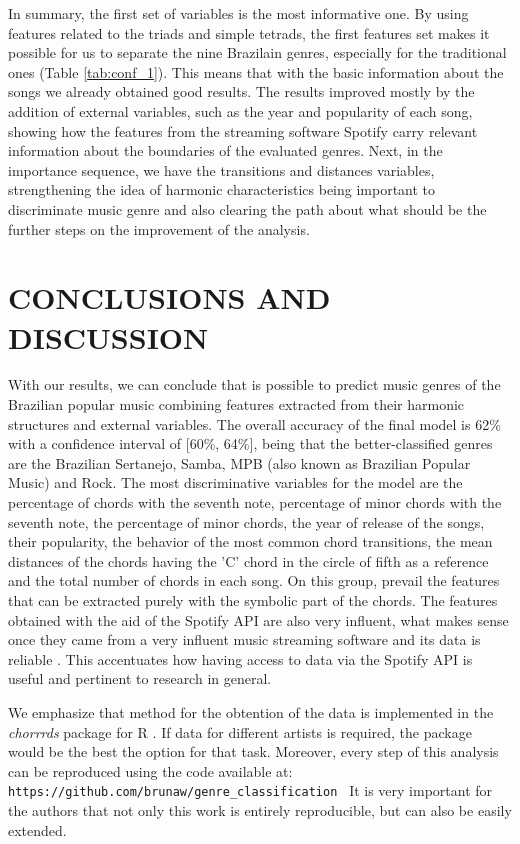 \documentclass[twocolumn]{article}
\begin{document}
In summary, the first set of variables is 
the most informative one. By using features
related to the triads and simple tetrads, the 
first features set makes it possible for us to separate 
the nine Brazilain genres, especially for the
traditional ones (Table \ref{tab:conf_1}). This means
that with the basic information about the songs we 
already obtained good results. The 
results improved mostly by the addition
of external variables, such as the year 
and popularity of each song, showing how 
the features from the streaming software 
Spotify carry relevant information
about the boundaries of the evaluated genres. 
Next, in the importance sequence, we have the transitions 
and distances variables, strengthening the idea of 
harmonic characteristics being important
to discriminate music genre and also clearing the 
path about what should be the further steps on the 
improvement of the analysis. 



\section{CONCLUSIONS AND DISCUSSION}

With our results, we can conclude that is possible
to predict music genres of the Brazilian popular music
combining features extracted from their harmonic structures
and external variables.  The overall accuracy of the final 
model is 62\% with a confidence interval of [60\%, 64\%],
being that the better-classified genres are the Brazilian
Sertanejo, Samba, MPB (also known as Brazilian Popular Music) 
and Rock. The most discriminative variables for the model 
are the percentage of chords with the seventh note, 
percentage of minor chords with the seventh note, the percentage 
of  minor chords, the year of release of the songs, their
popularity, the behavior of the most common chord transitions,
the mean distances of the chords having the 'C' chord in
the circle of fifth as a reference and the total number of
chords in each song. On this group, prevail the 
features that can be extracted purely with the symbolic
part of the chords. The features obtained with the aid of
the Spotify API are also very influent, what makes sense 
once they came from a very influent music streaming software
and its data is reliable \cite{Schettino2017}. This 
accentuates how having access to data via the Spotify API is 
useful and pertinent to research in general. 

We emphasize that method for the obtention of 
the data is implemented in the \textit{chorrrds} 
package for R \cite{chorrrds}. If data for different artists
is required, the package would be the best the option
for that task. Moreover, every step of this analysis can be 
reproduced using the code available at: \\
\small\texttt{https://github.com/brunaw/genre\_classification }
It is very important for the authors that not only 
this work is entirely reproducible, but can also
be easily extended.
\end{document}
